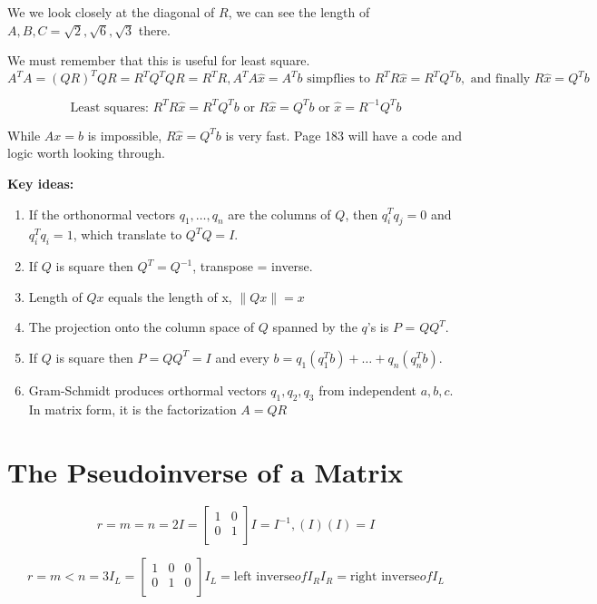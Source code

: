 We we look closely at the diagonal of \(R\), we can see the length of \(A, B, C = \sqrt{2}, \sqrt{6}, \sqrt{3}   \) there. 

We must remember that this is useful for least square. 
\[
    A^T A = (QR)^T QR = R^T Q^T QR = R^T R, A^T A\hat{x} = A^T b \text{ simpflies to } R^T R\hat{x} = R^T Q^T b, \text{ and finally } R\hat{x} = Q^T b 
\]

\[
    \text{Least squares: }
    R^T R\hat{x} = R^T Q^T b \text{ or } R\hat{x} = Q^T b \text{ or } \hat{x} = R^{-1} Q^T b 
\]

While \(Ax = b\) is impossible, \(R\hat{x} = Q^T b\) is very fast. Page 183 will have a code and logic worth looking through. 

\textbf{Key ideas:}
\begin{enumerate}
    \item If the orthonormal vectors \(q_1, \ldots, q_n\) are the columns of \(Q\), then \(q^T_i q_j = 0\) and \(q^T_i q_i = 1\), which translate to \(Q^T Q = I\). 
    \item If \(Q\) is square then \(Q^T = Q^{-1} \), transpose = inverse. 
    \item Length of \(Qx\) equals the length of x, \(\lVert Qx \rVert = x \)
    \item The projection onto the column space of \(Q\) spanned by the \(q\)'s is \(P\) = \(Q Q^T\). 
    \item If \(Q\) is square then \(P = Q Q^T = I\) and every \(b = q_1(q^T_1 b) + \ldots + q_n(q^T_n b)\). 
    \item Gram-Schmidt produces orthormal vectors \(q_1, q_2, q_3\) from independent \(a, b, c\). In matrix form, it is the factorization \(A = QR\)              
\end{enumerate}

\section{The Pseudoinverse of a Matrix}

\[
    r = m = n = 2 
    I = 
    \begin{bmatrix}
        1 & 0  \\
        0 &  1 \\
    \end{bmatrix}
    I = I^{-1}, (I)(I) = I 
\]

\[
    r = m < n = 3
    I_L = 
    \begin{bmatrix}
        1 & 0 & 0  \\
        0 & 1 & 0  \\
    \end{bmatrix}
    I_L = \text{left inverse} of I_R
    I_R = \text{right inverse} of I_L
\]

